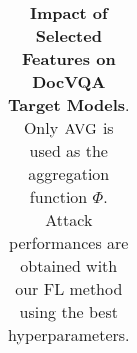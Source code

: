 \begin{table}[t]
\begin{minipage}{0.32\textwidth}
{\begin{tabular}{cccc}
                \bottomrule
            \end{tabular}
        }
        \label{tab:impact_feature_docvqa_donut}
    \end{minipage}
    \begin{minipage}{0.32\textwidth}
        \centering
        \label{tab:impact_feature_docvqa_pix2struct}
    \end{minipage}
\caption{\textbf{Impact of Selected Features on DocVQA Target Models}. Only $\textsc{AVG}$ is used as the aggregation function $\Phi$. Attack performances are obtained with our \textsc{FL} method using the best hyperparameters.}
\label{tab:impact_feature_docvqa}
\end{table}
